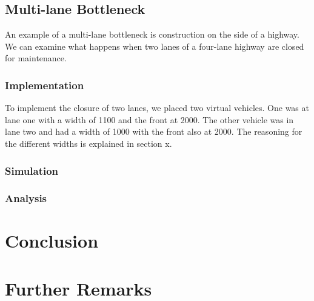 \documentclass[12pt]{article}
\begin{document}
    \subsection{Multi-lane Bottleneck}
    An example of a multi-lane bottleneck is construction on the side of a highway. We can examine what happens when two lanes of a four-lane highway are closed for maintenance. 
    \subsubsection{Implementation}
    To implement the closure of two lanes, we placed two virtual vehicles. One was at lane one with a width of 1100 and the front at 2000. The other vehicle was in lane two and had a width of 1000 with the front also at 2000.  The reasoning for the different widths is explained in section x.
    \subsubsection{Simulation}
    \subsubsection{Analysis}
    \section{Conclusion}
    \section{Further Remarks}
    \printunsrtglossary[type=symbols,style=long,title={List of Symbols and Constants}]
    \newpage 
    \printbibliography
\end{document}

